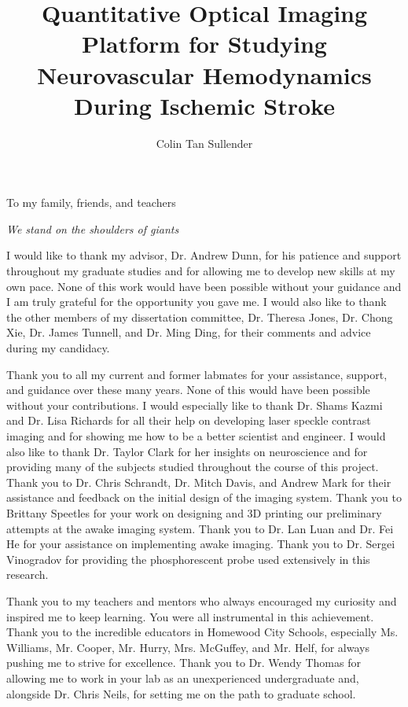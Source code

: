 \documentclass[12pt]{report}
\author{Colin Tan Sullender}
\title{Quantitative Optical Imaging Platform for Studying Neurovascular Hemodynamics During Ischemic Stroke}
\begin{document}
\copyrightpage      %
\commcertpage       %
\titlepage          %


\begin{dedication}
To my family, friends, and teachers

\textit{We stand on the shoulders of giants}

\end{dedication}


\begin{acknowledgments}
I would like to thank my advisor, Dr. Andrew Dunn, for his patience and support throughout my graduate studies and for allowing me to develop new skills at my own pace. None of this work would have been possible without your guidance and I am truly grateful for the opportunity you gave me. I would also like to thank the other members of my dissertation committee, Dr. Theresa Jones, Dr. Chong Xie, Dr. James Tunnell, and Dr. Ming Ding, for their comments and advice during my candidacy.

Thank you to all my current and former labmates for your assistance, support, and guidance over these many years. None of this would have been possible without your contributions. I would especially like to thank Dr. Shams Kazmi and Dr. Lisa Richards for all their help on developing laser speckle contrast imaging and for showing me how to be a better scientist and engineer. I would also like to thank Dr. Taylor Clark for her insights on neuroscience and for providing many of the subjects studied throughout the course of this project. Thank you to Dr. Chris Schrandt, Dr. Mitch Davis, and Andrew Mark for their assistance and feedback on the initial design of the imaging system. Thank you to Brittany Speetles for your work on designing and 3D printing our preliminary attempts at the awake imaging system. Thank you to Dr. Lan Luan and Dr. Fei He for your assistance on implementing awake imaging. Thank you to Dr. Sergei Vinogradov for providing the phosphorescent probe used extensively in this research.

Thank you to my teachers and mentors who always encouraged my curiosity and inspired me to keep learning. You were all instrumental in this achievement. Thank you to the incredible educators in Homewood City Schools, especially Ms. Williams, Mr. Cooper, Mr. Hurry, Mrs. McGuffey, and Mr. Helf, for always pushing me to strive for excellence. Thank you to Dr. Wendy Thomas for allowing me to work in your lab as an unexperienced undergraduate and, alongside Dr. Chris Neils, for setting me on the path to graduate school.


\end{acknowledgments}
\end{document}
